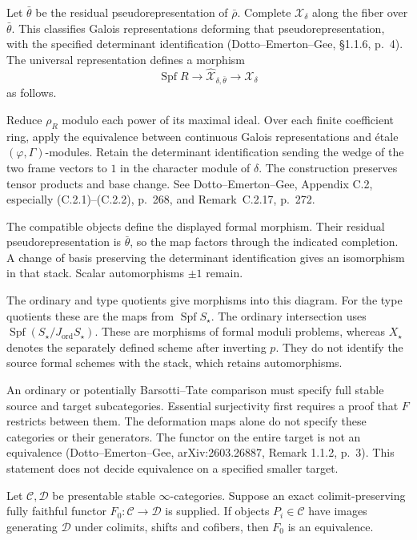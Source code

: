 Let $\bar\theta$ be the residual pseudorepresentation of $\bar\rho$.
Complete $\mathcal X_\delta$ along the fiber over $\bar\theta$.
This classifies Galois representations deforming that
pseudorepresentation, with the specified determinant identification
(Dotto--Emerton--Gee, \S1.1.6, p.~4).
The universal representation defines a morphism
\[
 \operatorname{Spf}R\longrightarrow
       \widehat{\mathcal X}_{\delta,\bar\theta}
       \longrightarrow\mathcal X_\delta
\]
as follows.

Reduce $\rho_R$ modulo each power of its maximal ideal.
Over each finite coefficient ring, apply the equivalence between
continuous Galois representations and \'etale $(\varphi,\Gamma)$-modules.
Retain the determinant identification sending the wedge of the
two frame vectors to $1$ in the character module of $\delta$.
The construction preserves tensor products and base change.
See Dotto--Emerton--Gee, Appendix C.2, especially (C.2.1)--(C.2.2),
p.~268, and Remark~C.2.17, p.~272.

The compatible objects define the displayed formal morphism.
Their residual pseudorepresentation is $\bar\theta$, so the map
factors through the indicated completion. A change of basis preserving
the determinant identification gives an isomorphism in that stack.
Scalar automorphisms $\pm1$ remain.

The ordinary and type quotients give
morphisms into this diagram. For the type quotients these are the maps from
$\operatorname{Spf}S_\star$. The ordinary intersection uses
$\operatorname{Spf}(S_\star/J_{\mathrm{ord}}S_\star)$.
These are morphisms of formal moduli problems, whereas $X_\star$
denotes the separately defined scheme after inverting $p$. They do not identify the source formal schemes with the
stack, which retains automorphisms.

An ordinary or potentially Barsotti--Tate comparison must specify
full stable source and target subcategories. Essential surjectivity
first requires a proof that $F$ restricts between them. The deformation maps alone do not specify these
categories or their generators. The functor on the entire target
is not an equivalence (Dotto--Emerton--Gee, arXiv:2603.26887, Remark 1.1.2, p.~3).
This statement does not decide equivalence on a specified smaller target.

\begin{proposition}
\label{v4-arith:ic:ordinary-local:generation}
Let $\mathcal C,\mathcal D$ be presentable stable
$\infty$-categories. Suppose an exact colimit-preserving fully
faithful functor $F_0:\mathcal C\to\mathcal D$ is supplied.
If objects $P_i\in\mathcal C$ have images generating $\mathcal D$
under colimits, shifts and cofibers, then $F_0$ is an equivalence.
\end{proposition}

